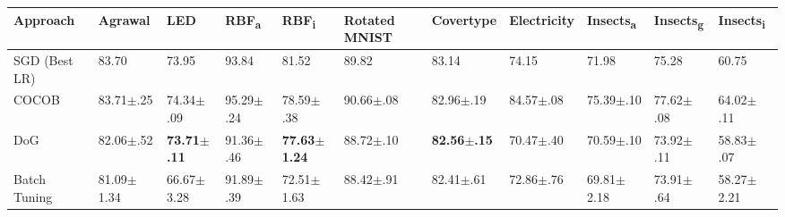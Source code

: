 \documentclass{article} %
\begin{document}
\begin{center}
   \begin{sideways}
      \begin{minipage}{0.9\textheight}
         \centering
         \scriptsize
         \begin{tabular}{lllllllllll}
            \toprule
            Approach                       & Agrawal                 & LED                     & RBF\textsubscript{a}    & RBF\textsubscript{i}     & Rotated MNIST             & Covertype                 & Electricity               & Insects\textsubscript{a} & Insects\textsubscript{g}  & Insects\textsubscript{i} \\
            \midrule
            SGD (Best LR)                  & 83.70                   & 73.95                   & 93.84                   & 81.52                    & 89.82                     & 83.14                     & 74.15                     & 71.98                    & 75.28                     & 60.75                    \\
            COCOB                          & 83.71$\pm$.25           & 74.34$\pm$.09           & 95.29$\pm$.24           & 78.59$\pm$.38            & 90.66$\pm$.08             & 82.96$\pm$.19             & 84.57$\pm$.08             & 75.39$\pm$.10            & 77.62$\pm$.08             & 64.02$\pm$.11            \\ \midrule
            DoG                            & 82.06$\pm$.52           & \bfseries 73.71$\pm$.11 & 91.36$\pm$.46           & \bfseries 77.63$\pm$1.24 & 88.72$\pm$.10             & \bfseries 82.56$\pm$.15   & 70.47$\pm$.40             & 70.59$\pm$.10            & 73.92$\pm$.11             & 58.83$\pm$.07            \\
            Batch Tuning                   & 81.09$\pm$1.34          & 66.67$\pm$3.28          & 91.89$\pm$.39           & 72.51$\pm$1.63           & 88.42$\pm$.91             & 82.41$\pm$.61             & 72.86$\pm$.76             & 69.81$\pm$2.18           & 73.91$\pm$.64             & 58.27$\pm$2.21           \\

\end{tabular}
\end{minipage}
\end{sideways}
\end{center}
\end{document}
